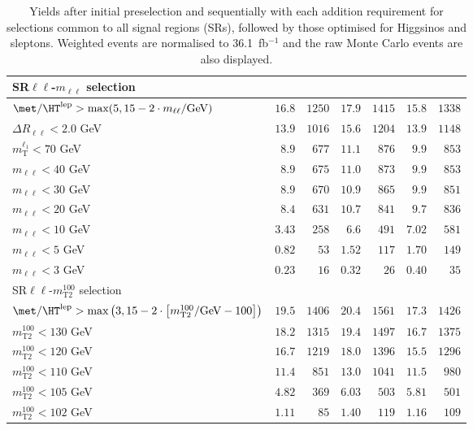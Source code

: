\begin{table}
\begin{center}
\begin{tabular*}{\textwidth}{@{\extracolsep{\fill}}lrrrrrr}
\midrule
SR$\ell\ell$-$m_{\ell\ell}$ selection &  &  & \\ 
\midrule
$\met / \HT^\text{lep} > \text{max}(5, 15-2\cdot m_{\ell\ell}/\text{GeV})$ & $16.8$ & $1250$    & $17.9$ & $1415$    & $15.8$ & $1338$   \\ 
    $\Delta R_{\ell\ell} < 2.0$ GeV & $13.9$ & $1016$    & $15.6$ & $1204$    & $13.9$ & $1148$   \\ 
    $m_\text{T}^{\ell_1} < 70$ GeV & $8.9$ & $677$    & $11.1$ & $876$    & $9.9$ & $853$   \\ 
    $m_{\ell\ell} < 40$ GeV & $8.9$ & $675$    & $11.0$ & $873$    & $9.9$ & $853$   \\ 
    $m_{\ell\ell} < 30$ GeV & $8.9$ & $670$    & $10.9$ & $865$    & $9.9$ & $851$   \\ 
    $m_{\ell\ell} < 20$ GeV & $8.4$ & $631$    & $10.7$ & $841$    & $9.7$ & $836$   \\ 
    $m_{\ell\ell} < 10$ GeV & $3.43$ & $258$    & $6.6$ & $491$    & $7.02$ & $581$   \\ 
    $m_{\ell\ell} < 5$ GeV & $0.82$ & $53$    & $1.52$ & $117$    & $1.70$ & $149$   \\ 
    $m_{\ell\ell} < 3$ GeV & $0.23$ & $16$    & $0.32$ & $26$    & $0.40$ & $35$   \\ 
    \midrule
SR$\ell\ell$-$m_\text{T2}^{100}$ selection &  &  & \\ 
\midrule
$\met / \HT^\text{lep} > \text{max}\left(3, 15-2\cdot \left[m_\text{T2}^{100}/\text{GeV} - 100\right]\right)$ & $19.5$ & $1406$    & $20.4$ & $1561$    & $17.3$ & $1426$   \\ 
    $m_\text{T2}^{100} < 130$ GeV & $18.2$ & $1315$    & $19.4$ & $1497$    & $16.7$ & $1375$   \\ 
    $m_\text{T2}^{100} < 120$ GeV & $16.7$ & $1219$    & $18.0$ & $1396$    & $15.5$ & $1296$   \\ 
    $m_\text{T2}^{100} < 110$ GeV & $11.4$ & $851$    & $13.0$ & $1041$    & $11.5$ & $980$   \\ 
    $m_\text{T2}^{100} < 105$ GeV & $4.82$ & $369$    & $6.03$ & $503$    & $5.81$ & $501$   \\ 
    $m_\text{T2}^{100} < 102$ GeV & $1.11$ & $85$    & $1.40$ & $119$    & $1.16$ & $109$   \\ 
    
  \bottomrule
  \end{tabular*}
\end{center}
\caption{ Yields after initial preselection and sequentially with each addition requirement 
for selections common to all signal regions (SRs), 
followed by those optimised for Higgsinos and sleptons. 
Weighted events are normalised to 36.1~fb$^{-1}$ and the raw Monte Carlo events are also displayed.
}
\label{tab:cutflow_NUHM2}
\end{table} 
  